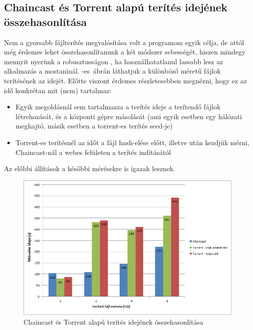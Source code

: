 %
\subsection{Chaincast és Torrent alapú terítés idejének összehasonlítása}
%

Nem a gyorsabb fájlterítés megvalósítása volt a programom egyik célja, de attól még érdemes lehet összehasonlítanunk a két módszer sebességét, hiszen mindegy mennyit nyerünk a robusztusságon , ha használhatatlanul lassabb lesz az alkalmazás a mostaninál. -es~ábrán láthatjuk a különböző méretű fájlok terítésének az idejét. Előtte viszont érdemes részletesebben megnézni, hogy ez az idő konkrétan mit (nem) tartalmaz:

\begin{itemize}
  \item Egyik megoldásnál sem tartalmazza a terítés ideje a terítendő fájlok létrehozását, és a központi gépre másolását (ami egyik esetben egy hálózati meghajtó, másik esetben a torrent-es terítés seed-je)
  \item Torrent-es terítésnél az időt a fájl hash-elése előtt, illetve után kezdjük mérni, Chaincast-nál a webes felületen a terítés indításától
\end{itemize}

Az előbbi állítások a későbbi mérésekre is igazak lesznek.

\begin{figure}[ht]
\centering
\includegraphics[width=150mm, keepaspectratio]{figures/Perf_chaincast_torrent_comparison.png}
\caption{Chaincast és Torrent alapú terítés idejének összehasonlítása}
\label{fig:chaincasttorrrentcomparison}
\end{figure}

